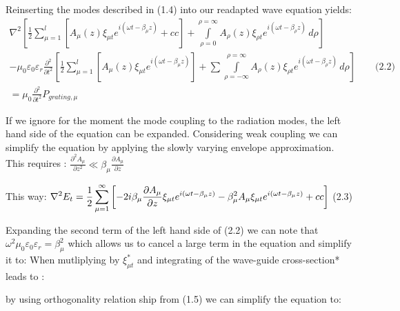 \documentclass[11pt, openright]{book}
\begin{document}
         Reinserting the modes described in (1.4) into our readapted wave equation yields:
          \begin{multline*}
            \nabla^2 \left[ \frac{1}{2} \sum_{\mu=1}^{l} \left[ A_\mu(z)\xi_{\mu t} e^{i(\omega t - \beta_\mu z)} + cc \right] + \int\limits_{\rho = 0}^{\rho=\infty} A_\rho(z) \xi_{\rho t} e^{i(\omega t -\beta_\rho z)}  \,d \rho \right]\\ -\mu_0\varepsilon_0\varepsilon_r \frac{\partial^{2} }{\partial t^{2}} \left[ \frac{1}{2} \sum_{\mu=1}^{l} \left[ A_\mu(z)\xi_{\mu t}e^{i(\omega t -\beta_\mu z)} \right] + \sum_{}^{} \int\limits_{\rho=-\infty}^{\rho=\infty} A_\rho(z)\xi_{\rho t} e^{i(\omega t-\beta_\rho z)} \,d\rho  \right]\qquad\text{(2.2)}\\ = \mu_0 \frac{\partial^{2} }{\partial t^{2}} P_{grating,\mu}
         \end{multline*}

        If we ignore for the moment the mode coupling to the radiation modes, the left hand side of the equation can be expanded. Considering weak coupling we can simplify the equation by applying the slowly varying envelope approximation. This requires : $\frac{\partial^{2} A_\mu}{\partial z^{2}} \ll \beta_\mu \frac{\partial A_\mu}{\partial z}  $
        
        This way: $\displaystyle{\nabla ^2 E_t = \frac{1}{2} \sum_{\mu=1}^{\infty}\left[ -2i\beta_\mu \frac{\partial A_\mu}{\partial z} \xi_{\mu t}e^{i(\omega t -\beta_\mu z)} -\beta_{\mu}^2A_\mu \xi_{\mu t} e^{i(\omega t - \beta_\mu z)}+ cc \right] }$ \hfill (2.3) 

        Expanding the second term of the left hand side of (2.2) we can note that $\omega^2\mu_0\varepsilon_0\varepsilon_r = \beta_{\mu}^2$ which allows us to cancel a large term in the equation and simplify it to: 
        When mutliplying by $\xi_{\mu t}^{*}$ and integrating of the wave-guide cross-section* leads to : 

        by using orthogonality relation ship from (1.5) we can simplify the equation to: 
\end{document}
